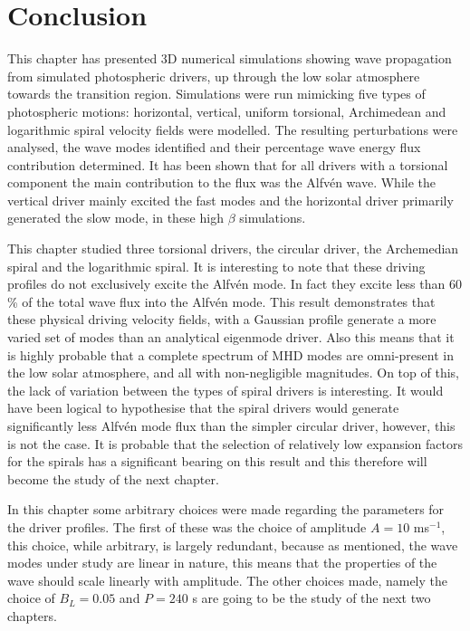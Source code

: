 \documentclass[a4paper,12pt,fourier,authoryear,custommargin]{Classes/PhDThesisPSnPDF}
\begin{document}
\section{Conclusion}
This chapter has presented 3D numerical simulations showing wave propagation from simulated photospheric drivers, up through the low solar atmosphere towards the transition region.
Simulations were run mimicking five types of photospheric motions: horizontal, vertical, uniform torsional, Archimedean and logarithmic spiral velocity fields were modelled.
The resulting perturbations were analysed, the wave modes identified and their percentage wave energy flux contribution determined. 
It has been shown that for all drivers with a torsional component the main contribution to the flux was the Alfv\'en wave.
While the vertical driver mainly excited the fast modes and the horizontal driver primarily generated the slow mode, in these high $\beta$ simulations.

This chapter studied three torsional drivers, the circular driver, the Archemedian spiral and the logarithmic spiral.
It is interesting to note that these driving profiles do not exclusively excite the Alfv\'en mode.
In fact they excite less than $60$ \% of the total wave flux into the Alfv\'en mode.
This result demonstrates that these physical driving velocity fields, with a Gaussian profile generate a more varied set of modes than an analytical eigenmode driver.
Also this means that it is highly probable that a complete spectrum of MHD modes are omni-present in the low solar atmosphere, and all with non-negligible magnitudes.
On top of this, the lack of variation between the types of spiral drivers is interesting.
It would have been logical to hypothesise that the spiral drivers would generate significantly less Alfv\'en mode flux than the simpler circular driver, however, this is not the case.
It is probable that the selection of relatively low expansion factors for the spirals has a significant bearing on this result and this therefore will become the study of the next chapter.

In this chapter some arbitrary choices were made regarding the parameters for the driver profiles.
The first of these was the choice of amplitude $A=10$ ms$^{-1}$, this choice, while arbitrary, is largely redundant, because as mentioned, the wave modes under study are linear in nature, this means that the properties of the wave should scale linearly with amplitude.
The other choices made, namely the choice of $B_L = 0.05$ and $P=240$ s are going to be the study of the next two chapters.
\end{document}
